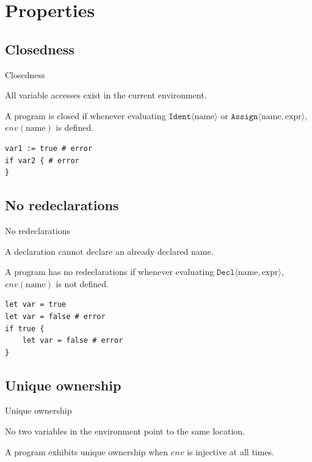 \documentclass{EESD}
\begin{document}

\section{Properties}


\subsection{Closedness}
\begin{frame}[fragile]{Closedness}

    All variable accesses exist in the current environment.

    \begin{definition}[Closedness]
        A program is closed if whenever evaluating $\texttt{Ident}\langle \text{name} \rangle$ or $\texttt{Assign}\langle \text{name}, \text{expr} \rangle$, $env(\text{name})$ is defined.
    \end{definition}

    \begin{lstlisting}
var1 := true # error
if var2 { # error
}
\end{lstlisting}
\end{frame}

\subsection{No redeclarations}
\begin{frame}[fragile]{No redeclarations}

    A declaration cannot declare an already declared name.

    \begin{definition}[No redeclarations]
        A program has no redeclarations if whenever evaluating $\texttt{Decl}\langle \text{name}, \text{expr} \rangle$, $env(\text{name})$ is not defined.
    \end{definition}

    \begin{lstlisting}
let var = true
let var = false # error
if true {
    let var = false # error
}
\end{lstlisting}
\end{frame}

\subsection{Unique ownership}
\begin{frame}{Unique ownership}

    No two variables in the environment point to the same location.

    \begin{definition}
        A program exhibits unique ownership when $env$ is injective at all times.
    \end{definition}
\end{frame}
\end{document}
